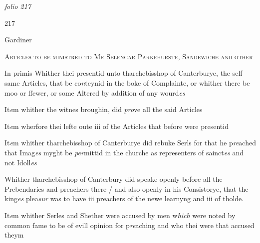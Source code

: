 \documentclass[12pt, a4paper]{book}
\begin{document}
\textit{folio 217}



\begin{flushright}{\color{Mahogany}217}\end{flushright}
            		
				\marginpar[\vspace{0.5cm}{\textcolor{Gray}{Gardiner}}]{}
			
            		
		\ifthenelse{\isodd{\thepage}}
		{\reversemarginpar}
		{\normalmarginpar}
		Gardiner

				\begin{center} \begin{large} {\scshape Articles to be ministred to Mr Selengar
	Parkehurste, Sandewiche and other} \end{large} \end{center}
			

		\ifthenelse{\isodd{\thepage}}
		{\reversemarginpar}
		{\normalmarginpar}
		In primis Whither thei presentid unto tharchebisshop of
Canterburye, the self same Articles, that be co\textit{n}teynid in the
boke of Complainte, or whither there be moo or ffewer, or 
some Altered by addition of any wourd\textit{es}
            		
		\ifthenelse{\isodd{\thepage}}
		{\reversemarginpar}
		{\normalmarginpar}
		It\textit{e}m whither the witnes broughin, did \textit{pro}ve all the said Articles

		\ifthenelse{\isodd{\thepage}}
		{\reversemarginpar}
		{\normalmarginpar}
		It\textit{e}m wherfore thei lefte oute iii of the Articles that before
	were presentid
            		
		\ifthenelse{\isodd{\thepage}}
		{\reversemarginpar}
		{\normalmarginpar}
		
It\textit{e}m whither tharchebisshop of Canterburye did rebuke Serls
for that he p\textit{re}ached that Imag\textit{es} myght be \textit{per}mittid in the churche
            			as representers of sainct\textit{es} and not Idoll\textit{es}
            		
		\ifthenelse{\isodd{\thepage}}
		{\reversemarginpar}
		{\normalmarginpar}
		Whither tharchebisshop of Canterbury did speake openly 
before all the Prebendaries and preachers there / and also 
openly in his Consistorye, that the king\textit{es} plea\textit{sur} was to have 
            			iii preachers of the newe learnyng and iii of tholde.
            		
		\ifthenelse{\isodd{\thepage}}
		{\reversemarginpar}
		{\normalmarginpar}
		It\textit{e}m whither Serles and Shether were accused by men w\textit{hich}
were noted by common fame to be of evill opinion for p\textit{re}aching
            			and who thei were that accused theym
            		
\end{document}
